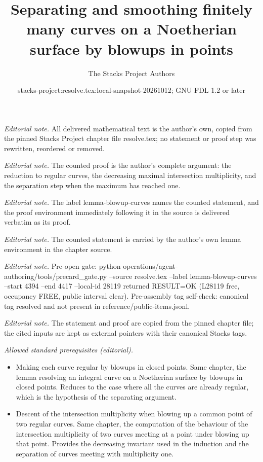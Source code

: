\documentclass[10pt,a4paper]{amsart}
\title{Separating and smoothing finitely many curves on a Noetherian surface by blowups in points}
\author{The Stacks Project Authors}
\date{stacks-project:resolve.tex:local-snapshot-20261012; GNU FDL 1.2 or later}
\theoremstyle{plain}
\theoremstyle{definition}
\theoremstyle{remark}
\numberwithin{equation}{subsection}
\begin{document}
\maketitle
\noindent\textit{Editorial note.} All delivered mathematical text is the author's own, copied from the pinned Stacks Project chapter file resolve.tex; no statement or proof step was rewritten, reordered or removed.\par\medskip
\noindent\textit{Editorial note.} The counted proof is the author's complete argument: the reduction to regular curves, the decreasing maximal intersection multiplicity, and the separation step when the maximum has reached one.\par\medskip
\noindent\textit{Editorial note.} The label lemma-blowup-curves names the counted statement, and the proof environment immediately following it in the source is delivered verbatim as its proof.\par\medskip
\noindent\textit{Editorial note.} The counted statement is carried by the author's own lemma environment in the chapter source.\par\medskip
\noindent\textit{Editorial note.} Pre-open gate: python operations/agent-authoring/tools/precard\_gate.py --source resolve.tex --label lemma-blowup-curves --start 4394 --end 4417 --local-id 28119 returned RESULT=OK (L28119 free, occupancy FREE, public interval clear). Pre-assembly tag self-check: canonical tag resolved and not present in reference/public-items.jsonl.\par\medskip
\noindent\textit{Editorial note.} The statement and proof are copied from the pinned chapter file; the cited inputs are kept as external pointers with their canonical Stacks tags.\par\medskip
\noindent\textit{Allowed standard prerequisites (editorial).}\begin{itemize}
\item Making each curve regular by blowups in closed points. Same chapter, the lemma resolving an integral curve on a Noetherian surface by blowups in closed points. Reduces to the case where all the curves are already regular, which is the hypothesis of the separating argument.
\item Descent of the intersection multiplicity when blowing up a common point of two regular curves. Same chapter, the computation of the behaviour of the intersection multiplicity of two curves meeting at a point under blowing up that point. Provides the decreasing invariant used in the induction and the separation of curves meeting with multiplicity one.
\end{itemize}\medskip
\end{document}
